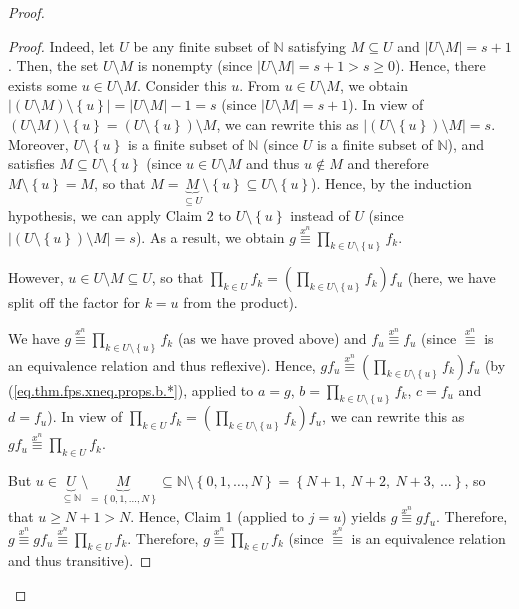 \begin{fineprint}
\begin{proof}
\begin{proof}
Indeed, let $U$ be any finite subset of $\mathbb{N}$ satisfying $M\subseteq U$
and $\left\vert U\setminus M\right\vert =s+1$. Then, the set $U\setminus M$ is
nonempty (since $\left\vert U\setminus M\right\vert =s+1>s\geq0$). Hence,
there exists some $u\in U\setminus M$. Consider this $u$. From $u\in
U\setminus M$, we obtain $\left\vert \left(  U\setminus M\right)
\setminus\left\{  u\right\}  \right\vert =\left\vert U\setminus M\right\vert
-1=s$ (since $\left\vert U\setminus M\right\vert =s+1$). In view of $\left(
U\setminus M\right)  \setminus\left\{  u\right\}  =\left(  U\setminus\left\{
u\right\}  \right)  \setminus M$, we can rewrite this as $\left\vert \left(
U\setminus\left\{  u\right\}  \right)  \setminus M\right\vert =s$. Moreover,
$U\setminus\left\{  u\right\}  $ is a finite subset of $\mathbb{N}$ (since $U$
is a finite subset of $\mathbb{N}$), and satisfies $M\subseteq U\setminus
\left\{  u\right\}  $ (since $u\in U\setminus M$ and thus $u\notin M$ and
therefore $M\setminus\left\{  u\right\}  =M$, so that $M=\underbrace{M}%
_{\subseteq U}\setminus\left\{  u\right\}  \subseteq U\setminus\left\{
u\right\}  $). Hence, by the induction hypothesis, we can apply Claim 2 to
$U\setminus\left\{  u\right\}  $ instead of $U$ (since $\left\vert \left(
U\setminus\left\{  u\right\}  \right)  \setminus M\right\vert =s$). As a
result, we obtain $g\overset{x^{n}}{\equiv}\prod_{k\in U\setminus\left\{
u\right\}  }f_{k}$.

However, $u\in U\setminus M\subseteq U$, so that $\prod_{k\in U}f_{k}=\left(
\prod_{k\in U\setminus\left\{  u\right\}  }f_{k}\right)  f_{u}$ (here, we have
split off the factor for $k=u$ from the product).

We have $g\overset{x^{n}}{\equiv}\prod_{k\in U\setminus\left\{  u\right\}
}f_{k}$ (as we have proved above) and $f_{u}\overset{x^{n}}{\equiv}f_{u}$
(since $\overset{x^{n}}{\equiv}$ is an equivalence relation and thus
reflexive). Hence, $gf_{u}\overset{x^{n}}{\equiv}\left(  \prod_{k\in
U\setminus\left\{  u\right\}  }f_{k}\right)  f_{u}$ (by
(\ref{eq.thm.fps.xneq.props.b.*}), applied to $a=g$, $b=\prod_{k\in
U\setminus\left\{  u\right\}  }f_{k}$, $c=f_{u}$ and $d=f_{u}$). In view of
$\prod_{k\in U}f_{k}=\left(  \prod_{k\in U\setminus\left\{  u\right\}  }%
f_{k}\right)  f_{u}$, we can rewrite this as $gf_{u}\overset{x^{n}}{\equiv
}\prod_{k\in U}f_{k}$.

But $u\in\underbrace{U}_{\subseteq\mathbb{N}}\setminus\underbrace{M}%
_{=\left\{  0,1,\ldots,N\right\}  }\subseteq\mathbb{N}\setminus\left\{
0,1,\ldots,N\right\}  =\left\{  N+1,\ N+2,\ N+3,\ \ldots\right\}  $, so that
$u\geq N+1>N$. Hence, Claim 1 (applied to $j=u$) yields $g\overset{x^{n}%
}{\equiv}gf_{u}$. Therefore, $g\overset{x^{n}}{\equiv}gf_{u}\overset{x^{n}%
}{\equiv}\prod_{k\in U}f_{k}$. Therefore, $g\overset{x^{n}}{\equiv}\prod_{k\in
U}f_{k}$ (since $\overset{x^{n}}{\equiv}$ is an equivalence relation and thus transitive).


\end{proof}
\end{proof}
\end{fineprint}
